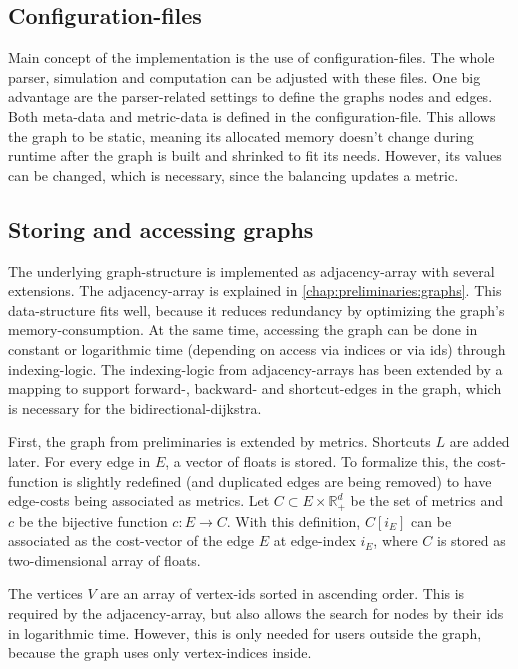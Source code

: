     \subsection{Configuration-files}

        Main concept of the implementation is the use of configuration-files.
        The whole parser, simulation and computation can be adjusted with these files.
        One big advantage are the parser-related settings to define the graphs nodes and edges.
        Both meta-data and \gls{metric}-data is defined in the configuration-file.
        This allows the graph to be static, meaning its allocated memory doesn't change during runtime after the graph is built and shrinked to fit its needs.
        However, its values can be changed, which is necessary, since the \gls{balancing} updates a \gls{metric}.

    \subsection{Storing and accessing graphs}
    \label{chap:balancing:implementation:graphs}

        The underlying graph-structure is implemented as adjacency-array with several extensions.
        The adjacency-array is explained in \cref{chap:preliminaries:graphs}.
        This data-structure fits well, because it reduces redundancy by optimizing the graph's memory-consumption.
        At the same time, accessing the graph can be done in constant or logarithmic time (depending on access via indices or via ids) through indexing-logic.
        The indexing-logic from adjacency-arrays has been extended by a mapping to support forward-, backward- and shortcut-edges in the graph, which is necessary for the bidirectional-\gls{dijkstra}.

        First, the graph from preliminaries is extended by \glspl{metric}.
        Shortcuts $L$ are added later.
        For every edge in $E$, a vector of floats is stored.
        To formalize this, the cost-function is slightly redefined (and duplicated edges are being removed) to have edge-costs being associated as \glspl{metric}.
        Let $C \subset E \times \mathbb{R}_+^d$ be the set of \glspl{metric} and $c$ be the bijective function $c: E \to C$.
        With this definition, $C[i_E]$ can be associated as the cost-vector of the edge $E$ at edge-index $i_E$, where $C$ is stored as two-dimensional array of floats.

        The vertices $V$ are an array of vertex-ids sorted in ascending order.
        This is required by the adjacency-array, but also allows the search for nodes by their ids in logarithmic time.
        However, this is only needed for users outside the graph, because the graph uses only vertex-indices inside.

